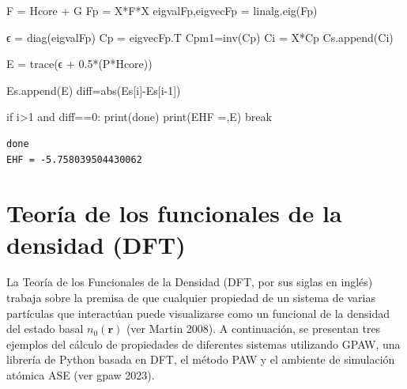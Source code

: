 \documentclass[
  letterpaper,
  DIV=11,
  numbers=noendperiod]{scrreprt}
\newenvironment{Shaded}{\begin{snugshade}}{\end{snugshade}}
\newcommand{\BuiltInTok}[1]{\textcolor[rgb]{0.00,0.23,0.31}{#1}}
\newcommand{\ControlFlowTok}[1]{\textcolor[rgb]{0.00,0.23,0.31}{#1}}
\newcommand{\DecValTok}[1]{\textcolor[rgb]{0.68,0.00,0.00}{#1}}
\newcommand{\FloatTok}[1]{\textcolor[rgb]{0.68,0.00,0.00}{#1}}
\newcommand{\KeywordTok}[1]{\textcolor[rgb]{0.00,0.23,0.31}{#1}}
\newcommand{\NormalTok}[1]{\textcolor[rgb]{0.00,0.23,0.31}{#1}}
\newcommand{\OperatorTok}[1]{\textcolor[rgb]{0.37,0.37,0.37}{#1}}
\newcommand{\StringTok}[1]{\textcolor[rgb]{0.13,0.47,0.30}{#1}}
\begin{document}
\begin{Shaded}
\begin{Highlighting}[]
\NormalTok{    F }\OperatorTok{=}\NormalTok{ Hcore }\OperatorTok{+}\NormalTok{ G}
\NormalTok{    Fp }\OperatorTok{=}\NormalTok{ X}\OperatorTok{*}\NormalTok{F}\OperatorTok{*}\NormalTok{X}
\NormalTok{    eigvalFp,eigvecFp }\OperatorTok{=}\NormalTok{ linalg.eig(Fp)}
    
\NormalTok{    ϵ }\OperatorTok{=}\NormalTok{ diag(eigvalFp)}
\NormalTok{    Cp }\OperatorTok{=}\NormalTok{ eigvecFp.T}
\NormalTok{    Cpm1}\OperatorTok{=}\NormalTok{inv(Cp)}
\NormalTok{    Ci }\OperatorTok{=}\NormalTok{ X}\OperatorTok{*}\NormalTok{Cp}
\NormalTok{    Cs.append(Ci)}

\NormalTok{    E }\OperatorTok{=}\NormalTok{ trace(ϵ }\OperatorTok{+} \FloatTok{0.5}\OperatorTok{*}\NormalTok{(P}\OperatorTok{*}\NormalTok{Hcore))}

\NormalTok{    Es.append(E)}
\NormalTok{    diff}\OperatorTok{=}\BuiltInTok{abs}\NormalTok{(Es[i]}\OperatorTok{{-}}\NormalTok{Es[i}\OperatorTok{{-}}\DecValTok{1}\NormalTok{])}
    
    \ControlFlowTok{if}\NormalTok{ i}\OperatorTok{\textgreater{}}\DecValTok{1} \KeywordTok{and}\NormalTok{ diff}\OperatorTok{==}\DecValTok{0}\NormalTok{:}
        \BuiltInTok{print}\NormalTok{(}\StringTok{\textquotesingle{}done\textquotesingle{}}\NormalTok{)}
        \BuiltInTok{print}\NormalTok{(}\StringTok{\textquotesingle{}EHF =\textquotesingle{}}\NormalTok{,E)}
        \ControlFlowTok{break}
\end{Highlighting}
\end{Shaded}

\begin{verbatim}
done
EHF = -5.758039504430062
\end{verbatim}


\hypertarget{teoruxeda-de-los-funcionales-de-la-densidad-dft}{%
\chapter{Teoría de los funcionales de la densidad
(DFT)}\label{teoruxeda-de-los-funcionales-de-la-densidad-dft}}

La Teoría de los Funcionales de la Densidad (DFT, por sus siglas en
inglés) trabaja sobre la premisa de que cualquier propiedad de un
sistema de varias partículas que interactúan puede visualizarse como un
funcional de la densidad del estado basal \(n_0(\textbf{r})\) (ver
Martin 2008). A continuación, se presentan tres ejemplos del cálculo de
propiedades de diferentes sistemas utilizando GPAW, una librería de
Python basada en DFT, el método PAW y el ambiente de simulación atómica
ASE (ver gpaw 2023).
\end{document}

